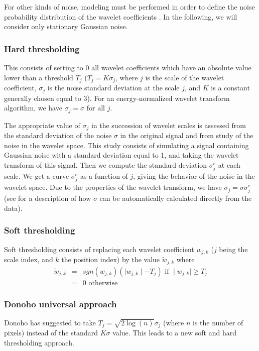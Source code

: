For other kinds of noise, modeling must be performed in order to 
define the noise probability distribution of the wavelet coefficients 
\cite{starck:book98}.   
In the following, we will consider only stationary Gaussian noise.


\subsubsection*{Hard thresholding}
\label{hardsect}
This consists of setting to 0 all wavelet coefficients which have an absolute
value lower than a threshold $T_j$ ($T_j = K \sigma_j$, where $j$ is the
scale of the wavelet coefficient, $\sigma_j$ is the noise standard 
deviation at the scale $j$, and $K$ is a constant generally chosen equal to 3).
For an energy-normalized wavelet transform algorithm, we have $\sigma_j = \sigma$
for all $j$. 

The appropriate value of $\sigma_j$ 
in the succession of wavelet scales is assessed 
from the standard deviation of the noise $\sigma$ in the original signal
and from study of the noise in the wavelet space.  This study consists of 
simulating a signal containing Gaussian noise with a standard deviation 
equal to 1, and taking the wavelet transform of this signal.  Then we
compute the standard deviation $\sigma^e_j$ at each scale.  We get a curve 
$\sigma^e_j$ as a function of $j$, giving the behavior of the noise in the 
wavelet space. Due to the properties of the wavelet transform, we have 
$ \sigma_j = \sigma \sigma^e_j $ (see \cite{starck:sta98_3} for a description
of how $\sigma$ can be automatically calculated directly from the data).


\subsubsection*{Soft thresholding}
Soft thresholding consists of replacing each wavelet coefficient $w_{j,k}$
($j$ being the scale index, and $k$ the position index)
by the value $\tilde w_{j,k}$ where
\begin{eqnarray}
\tilde w_{j,k}  & = & sgn(w_{j,k}) ( \mid w_{j,k} \mid - T_j) \mbox{ if } \mid w_{j,k} \mid 
\geq  T_j  \\
         & = & 0  \mbox{ otherwise} 
\end{eqnarray}

\subsubsection*{Donoho universal approach}
Donoho \cite{rest:donoho93_1,rest:donoho93_2} has suggested to take 
$T_j =  \sqrt{2\log(n)}\sigma_j$ (where $n$ 
is the number of pixels) instead of the standard $K \sigma$ value. This 
leads to a new soft and hard thresholding approach.

